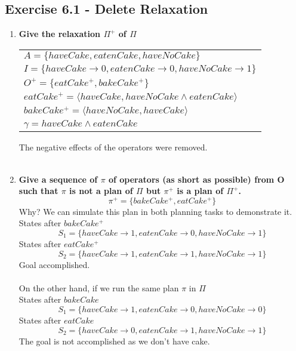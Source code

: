 \documentclass[12pt,a4paper]{article}
\begin{document}
	\subsection*{Exercise 6.1 - Delete Relaxation}
	\begin{enumerate}[label=(\alph*)]
		\item \textbf{Give the relaxation $\Pi^+$ of $\Pi$}
		
		\begin{center}
			\begin{tabular}{l}
				$A = \lbrace haveCake, eatenCake, haveNoCake \rbrace $ \\
				$I = \lbrace haveCake \rightarrow 0, eatenCake \rightarrow 0, haveNoCake \rightarrow 1 \rbrace $ \\
				$ O^+ = \lbrace eatCake^+, bakeCake^+ \rbrace $ \\
				$eatCake^+ = \langle  haveCake, haveNoCake \land eatenCake \rangle $\\
				$bakeCake^+ = \langle  haveNoCake, haveCake \rangle $\\
				$\gamma = haveCake \land eatenCake $
			\end{tabular}
		\end{center}
	The negative effects of the operators were removed.\\\\
	
	\item \textbf{Give a sequence of $\pi$ of operators (as short as possible) from O such that $\pi$ is not a plan of $\Pi$ but $\pi^+$ is a plan of $\Pi^+$.}\\
		\[ \pi^+ = \{ bakeCake^+, eatCake^+ \} \]
		Why? We can simulate this plan in both planning tasks to demonstrate it.\\
		States after $bakeCake^+$ 	
		\[S_1 = \lbrace haveCake \rightarrow 1, eatenCake \rightarrow 0, haveNoCake \rightarrow 1 \rbrace \]
		States after $eatCake^+$ 	
		\[S_2 = \lbrace haveCake \rightarrow 1, eatenCake \rightarrow 1, haveNoCake \rightarrow 1 \rbrace \]
		Goal accomplished. \\\\
		On the other hand, if we run the same plan $\pi$ in $\Pi$\\
		States after $bakeCake$ 	
		\[S_1 = \lbrace haveCake \rightarrow 1, eatenCake \rightarrow 0, haveNoCake \rightarrow 0 \rbrace \]
		States after $eatCake$ 	
		\[S_2 = \lbrace haveCake \rightarrow 0, eatenCake \rightarrow 1, haveNoCake \rightarrow 1 \rbrace \]
		The goal is not accomplished as we don't have cake.
	\end{enumerate}
\end{document}
